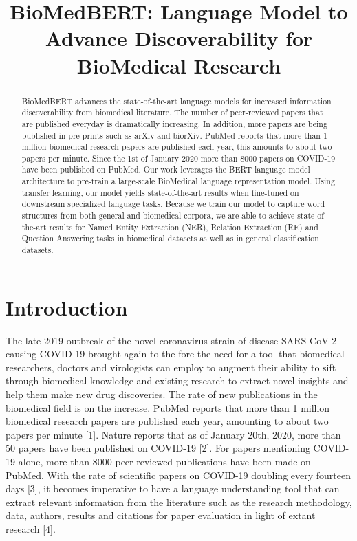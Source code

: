 \documentclass{article}
\title{BioMedBERT: Language Model to Advance Discoverability for BioMedical Research}
\author{
}
\begin{document}
\maketitle
\begin{abstract}
BioMedBERT advances the state-of-the-art language models for increased information discoverability from biomedical literature. The number of peer-reviewed papers that are published everyday is dramatically increasing. In addition, more papers are being published in pre-prints such as arXiv and biorXiv. PubMed reports that more than 1 million biomedical research papers are published each year, this amounts to about two papers per minute. Since the 1st of January 2020 more than 8000 papers on COVID-19 have been published on PubMed. Our work leverages the BERT language model architecture to pre-train a large-scale BioMedical language representation model. Using transfer learning, our model yields state-of-the-art results when fine-tuned on downstream specialized language tasks. Because we train our model to capture word structures from both general and biomedical corpora, we are able to achieve state-of-the-art results for Named Entity Extraction (NER), Relation Extraction (RE) and Question Answering tasks in biomedical datasets as well as in general classification datasets. 
\end{abstract}




\section{Introduction}
The late 2019 outbreak of the novel coronavirus strain of disease SARS-CoV-2 causing COVID-19 brought again to the fore the need for a tool that biomedical researchers, doctors and virologists can employ to augment their ability to sift through biomedical knowledge and existing research to extract novel insights and help them make new drug discoveries. The rate of new publications in the biomedical field is on the increase. PubMed reports that more than 1 million biomedical research papers are published each year, amounting to about two papers per minute [1]. Nature reports that as of January 20th, 2020, more than 50 papers have been published on COVID-19 [2]. For papers mentioning COVID-19 alone, more than 8000 peer-reviewed publications have been made on PubMed. With the rate of scientific papers on COVID-19 doubling every fourteen days [3], it becomes imperative to have a language understanding tool that can extract relevant information from the literature such as the research methodology, data, authors, results and citations for paper evaluation in light of extant research [4].
\end{document}
